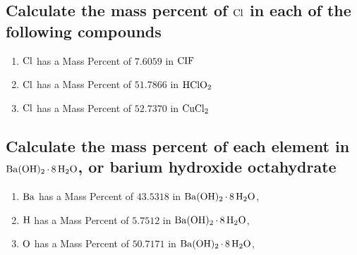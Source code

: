 \documentclass[11pt]{article}
\begin{document}
\subsection{Calculate the mass percent of \(\ce{Cl}\) in each of the following compounds}
\label{sec:org71e48b0}
\begin{enumerate}
\item \(\ce{Cl}\)  has a Mass Percent of \(7.6059\) in \(\ce{CIF}\)
\item \(\ce{Cl}\)  has a Mass Percent of \(51.7866\) in \(\ce{HClO2}\)
\item \(\ce{Cl}\)  has a Mass Percent of \(52.7370\) in \(\ce{CuCl2}\)
\end{enumerate}

\subsection{Calculate the mass percent of each element in \(\ce{Ba(OH)2*8H2O}\), or barium hydroxide octahydrate}
\label{sec:orga3a598f}
\begin{enumerate}
\item \(\ce{Ba}\)  has a Mass Percent of \(43.5318\) in \(\ce{Ba(OH)2*8H2O}\),
\item \(\ce{H}\)  has a Mass Percent of \(5.7512\) in \(\ce{Ba(OH)2*8H2O}\),
\item \(\ce{O}\)  has a Mass Percent of \(50.7171\) in \(\ce{Ba(OH)2*8H2O}\),
\end{enumerate}
\end{document}
